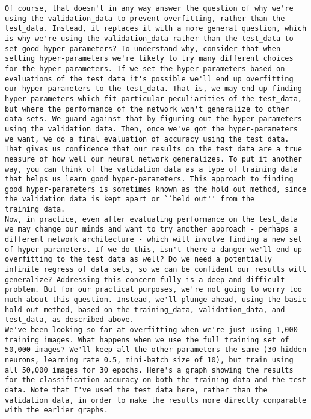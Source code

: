 \begin{lstlisting}
Of course, that doesn't in any way answer the question of why we're using the validation_data to prevent overfitting, rather than the test_data. Instead, it replaces it with a more general question, which is why we're using the validation_data rather than the test_data to set good hyper-parameters? To understand why, consider that when setting hyper-parameters we're likely to try many different choices for the hyper-parameters. If we set the hyper-parameters based on evaluations of the test_data it's possible we'll end up overfitting our hyper-parameters to the test_data. That is, we may end up finding hyper-parameters which fit particular peculiarities of the test_data, but where the performance of the network won't generalize to other data sets. We guard against that by figuring out the hyper-parameters using the validation_data. Then, once we've got the hyper-parameters we want, we do a final evaluation of accuracy using the test_data. That gives us confidence that our results on the test_data are a true measure of how well our neural network generalizes. To put it another way, you can think of the validation data as a type of training data that helps us learn good hyper-parameters. This approach to finding good hyper-parameters is sometimes known as the hold out method, since the validation_data is kept apart or ``held out'' from the training_data.
Now, in practice, even after evaluating performance on the test_data we may change our minds and want to try another approach - perhaps a different network architecture - which will involve finding a new set of hyper-parameters. If we do this, isn't there a danger we'll end up overfitting to the test_data as well? Do we need a potentially infinite regress of data sets, so we can be confident our results will generalize? Addressing this concern fully is a deep and difficult problem. But for our practical purposes, we're not going to worry too much about this question. Instead, we'll plunge ahead, using the basic hold out method, based on the training_data, validation_data, and test_data, as described above.
We've been looking so far at overfitting when we're just using 1,000 training images. What happens when we use the full training set of 50,000 images? We'll keep all the other parameters the same (30 hidden neurons, learning rate 0.5, mini-batch size of 10), but train using all 50,000 images for 30 epochs. Here's a graph showing the results for the classification accuracy on both the training data and the test data. Note that I've used the test data here, rather than the validation data, in order to make the results more directly comparable with the earlier graphs.


\end{lstlisting}
